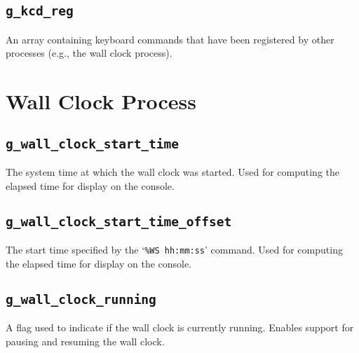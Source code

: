 \documentclass[12pt]{report}
\begin{document}
\subsection{\texttt{g_kcd_reg}}

An array containing keyboard commands that have been registered by other processes (e.g., the wall clock process).

\section{Wall Clock Process}

\subsection{\texttt{g_wall_clock_start_time}}

The system time at which the wall clock was started. Used for computing the elapsed time for display on the console.

\subsection{\texttt{g_wall_clock_start_time_offset}}

The start time specified by the `\texttt{\%WS hh:mm:ss}' command. Used for computing the elapsed time for display on the console.

\subsection{\texttt{g_wall_clock_running}}

A flag used to indicate if the wall clock is currently running. Enables support for pausing and resuming the wall clock.
\end{document}
